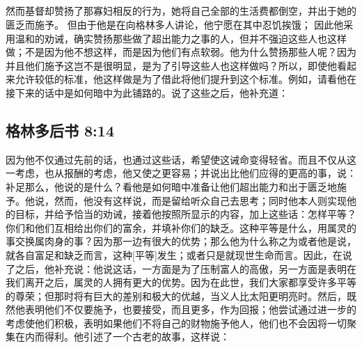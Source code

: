 
\subsection{}

\par

然而基督却赞扬了那寡妇相反的行为，她将自己全部的生活费都倒空，并出于她的匮乏而施予。 但由于他是在向格林多人讲论，他宁愿在其中忍饥挨饿； 因此他采用温和的劝诫，确实赞扬那些做了超出能力之事的人，但并不强迫这些人也这样做；不是因为他不想这样，而是因为他们有点软弱。他为什么赞扬那些人呢？因为并且他们施予这岂不是很明显，是为了引导这些人也这样做吗？所以，即使他看起来允许较低的标准，他这样做是为了借此将他们提升到这个标准。例如，请看他在接下来的话中是如何暗中为此铺路的。说了这些之后，他补充道：\par


\subsection{格林多后书 8:14}

\par

因为他不仅通过先前的话，也通过这些话，希望使这诫命变得轻省。而且不仅从这一考虑，也从报酬的考虑，他又使之更容易；并说出比他们应得的更高的事，说：补足那么，他说的是什么？看他是如何暗中准备让他们超出能力和出于匮乏地施予。他说，然而，他没有这样说，而是留给听众自己去思考；同时他本人则实现他的目标，并给予恰当的劝诫，接着他按照所显示的内容，加上这些话：怎样平等？你们和他们互相给出你们的富余，并填补你们的缺乏。这种平等是什么，用属灵的事交换属肉身的事？因为那一边有很大的优势；那么他为什么称之为或者他是说，就各自富足和缺乏而言，这种[平等]发生；或者只是就现世生命而言。因此，在说了之后，他补充说：他说这话，一方面是为了压制富人的高傲，另一方面是表明在我们离开之后，属灵的人拥有更大的优势。因为在此世，我们大家都享受许多平等的尊荣；但那时将有巨大的差别和极大的优越，当义人比太阳更明亮时。然后，既然他表明他们不仅要施予，也要接受，而且更多，作为回报；他尝试通过进一步的考虑使他们积极，表明如果他们不将自己的财物施予他人，他们也不会因将一切聚集在内而得利。他引述了一个古老的故事，这样说：\par

